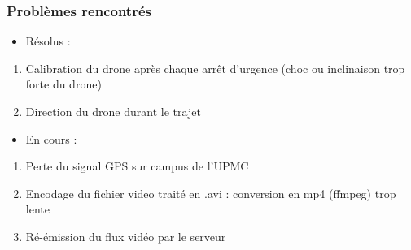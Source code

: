 \documentclass{beamer}
\begin{document}



	






	
	



	
	
	\begin{frame}
		\begin{center}
		\frametitle{Problèmes rencontrés}
	    \begin{itemize}
                 \item Résolus :
            \end{itemize}
        \begin{enumerate}
             
            \item Calibration du drone après chaque arrêt d'urgence (choc ou inclinaison trop forte du drone)
             \item Direction du drone durant le trajet
             \end{enumerate}
            \begin{itemize}
                \item En cours :
            \end{itemize}
            \begin{enumerate}
           \item Perte du signal GPS sur campus de l'UPMC
           \item Encodage du fichier video traité en .avi : conversion en mp4 (ffmpeg) trop lente
           \item Ré-émission du flux vidéo par le serveur
           \end{enumerate}
		\end{center}
	\end{frame}

	
\end{document}

